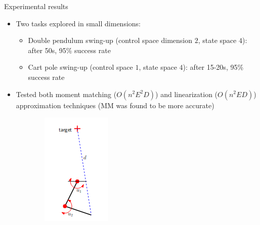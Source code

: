 \documentclass{beamer}
\begin{document}
\begin{frame}{Experimental results}
	
	\begin{minipage}{0.70\textwidth}
	\begin{itemize}
		\item Two tasks explored in small dimensions:
		\begin{itemize}
			\item Double pendulum swing-up (control space dimension $2$, state space $4$): after 50s, 95\% success rate
			\item Cart pole swing-up (control space $1$, state space $4$): after 15-20s, 95\% success rate
		\end{itemize} 
		\item Tested both moment matching ($O(n^2E^2D)$) and linearization ($O(n^2 ED)$) approximation techniques (MM was found to be more accurate)
	\end{itemize}
	\end{minipage}
	\begin{minipage}{0.25\textwidth}
		\begin{figure}[t]
			\begin{subfigure}{\linewidth}
				\centering
				\includegraphics[width=0.9\linewidth]{./double_pendulum.png}
			\end{subfigure}

		\end{figure}
	\end{minipage}
\end{frame}
\end{document}
